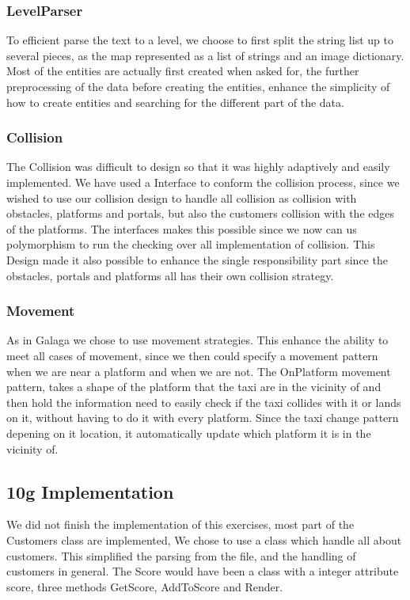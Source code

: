 \documentclass[../master.tex]{subfile}
\begin{document}
\subsubsection{LevelParser}
To efficient parse the text to a level, we choose to first split the string list up to several pieces, as the map represented as a list of strings and an image dictionary. Most of the entities are actually first created when asked for, the further preprocessing of the data before creating the entities, enhance the simplicity of how to create entities and searching for the different part of the data.

\subsubsection{Collision}
The Collision was difficult to design so that it was highly adaptively and easily implemented. We have used a Interface to conform the collision process, since we wished to use our collision design to handle all collision as collision with obstacles, platforms and portals, but also the customers collision with the edges of the platforms. The interfaces makes this possible since we now can us polymorphism to run the checking over all implementation of collision. This Design made it also possible to enhance the single responsibility part since the obstacles, portals and platforms all has their own collision strategy.

\subsubsection{Movement}
As in Galaga we chose to use movement strategies. This enhance the ability to meet all cases of movement, since we then could specify a movement pattern when we are near a platform and when we are not. The OnPlatform movement pattern, takes a shape of the platform that the taxi are in the vicinity of and then hold the information need to easily check if the taxi collides with it or lands on it, without having to do it with every platform. Since the taxi change pattern depening on it location, it automatically update which platform it is in the vicinity of.

\subsection{10g Implementation}
We did not finish the implementation of this exercises, most part of the Customers class are implemented, We chose to use a class which handle all about customers. This simplified the parsing from the file, and the handling of customers in general. The Score would have been a class with a integer attribute score, three methods GetScore, AddToScore and Render. 
\end{document}
